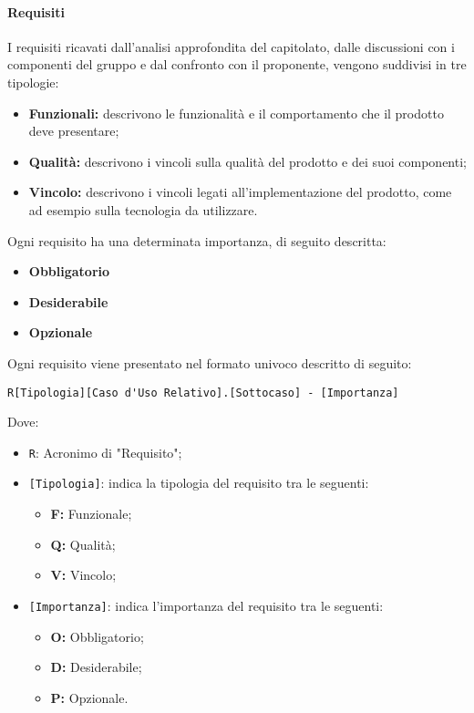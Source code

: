 \documentclass[a4paper, 12pt]{article}
\begin{document}
\paragraph{Requisiti}
I requisiti ricavati dall'analisi approfondita del capitolato, dalle discussioni
con i componenti del gruppo e dal confronto con il proponente, vengono suddivisi
in tre tipologie:
\begin{itemize}
    \item \textbf{Funzionali:} descrivono le funzionalità e il comportamento
    che il prodotto deve presentare;
    \item \textbf{Qualità:} descrivono i vincoli sulla qualità del prodotto e
    dei suoi componenti;
    \item \textbf{Vincolo:} descrivono i vincoli legati all'implementazione del
    prodotto, come ad esempio sulla tecnologia da utilizzare.
\end{itemize}
Ogni requisito ha una determinata importanza, di seguito descritta:
\begin{itemize}
    \item \textbf{Obbligatorio}
    \item \textbf{Desiderabile}
    \item \textbf{Opzionale}
\end{itemize}
Ogni requisito viene presentato nel formato univoco descritto di seguito: 
\begin{center}
    \begin{BVerbatim}
R[Tipologia][Caso d'Uso Relativo].[Sottocaso] - [Importanza]
    \end{BVerbatim}   
\end{center}
Dove:
\begin{itemize}
    \item \Verb^R^: Acronimo di "Requisito";
    \item \Verb^[Tipologia]^: indica la tipologia del requisito tra le seguenti:
    \begin{itemize}
        \item \textbf{F:} Funzionale;
        \item \textbf{Q:} Qualità;
        \item \textbf{V:} Vincolo;
    \end{itemize}
    \item \Verb^[Importanza]^: indica l'importanza del requisito tra le seguenti:
    \begin{itemize}
        \item \textbf{O:} Obbligatorio;
        \item \textbf{D:} Desiderabile;
        \item \textbf{P:} Opzionale.
    \end{itemize}
\end{itemize}
\end{document}
